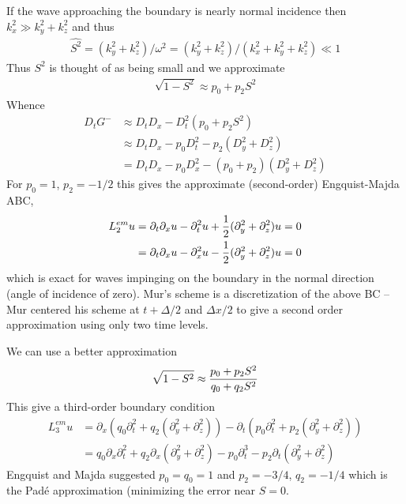 If the wave approaching the boundary is nearly normal incidence then $ k_x^2  \gg k_y^2 + k_z^2$
and thus 
\begin{align*}
  \widehat{S^2} = (k_y^2 +  k_z^2)/\omega^2 = (k_y^2 +  k_z^2)/( k_x^2 + k_y^2 +  k_z^2) \ll 1 
\end{align*}
Thus $S^2$ is thought of as being small and we approximate
\begin{align*}
   \sqrt{ 1-S^2} \approx p_0 + p_2 S^2
\end{align*}
Whence
\begin{align*}
   D_t G^{-} &\approx D_tD_x - D_t^2(p_0 + p_2 S^2) \\
              &\approx D_t D_x -p_0  D_t^2 - p_2 (D_y^2+D_z^2) \\
              & = D_t D_x - p_0  D_x^2 - (p_0+p_2) (D_y^2+D_z^2)
\end{align*}
For $p_0=1$, $p_2=-1/2$ this gives the approximate (second-order) Engquist-Majda ABC,
\begin{align}
   L_{2}^{em}u  & = \partial_t\partial_x u -\partial_t^2 u + {1\over 2} (\partial_y^2+\partial_z^2)u = 0 \\
                  &= \partial_t\partial_x u -\partial_x^2 u -{1\over 2} (\partial_y^2+\partial_z^2)u = 0 
\end{align}
which is exact for waves impinging on the boundary in the normal direction (angle of incidence of zero).
Mur's scheme is a discretization of the above BC -- Mur centered his scheme at $t+\Delta/2$ and $\Delta x/2$
to give a second order approximation using only two time levels.



We can use a better approximation
\begin{align*}
   \sqrt{ 1-S^2} \approx { p_0 + p_2 S^2 \over q_0 + q_2 S^2 } 
\end{align*}
This give a third-order boundary condition
\begin{align}
   L_{3}^{em}u  & = \partial_x(q_0\partial_t^2 + q_2(\partial_y^2+\partial_z^2)) 
                         - \partial_t( p_0\partial_t^2 + p_2(\partial_y^2+\partial_z^2))\\
                & = q_0\partial_x \partial_t^2 + q_2 \partial_x(\partial_y^2+\partial_z^2)
                       - p_0 \partial_t^3 - p_2 \partial_t(\partial_y^2+\partial_z^2)
\end{align}
Engquist and Majda suggested $p_0=q_0=1$ and $p_2=-3/4$, $q_2=-1/4$ which is the Pad\'e approximation (minimizing
the error near $S=0$.

